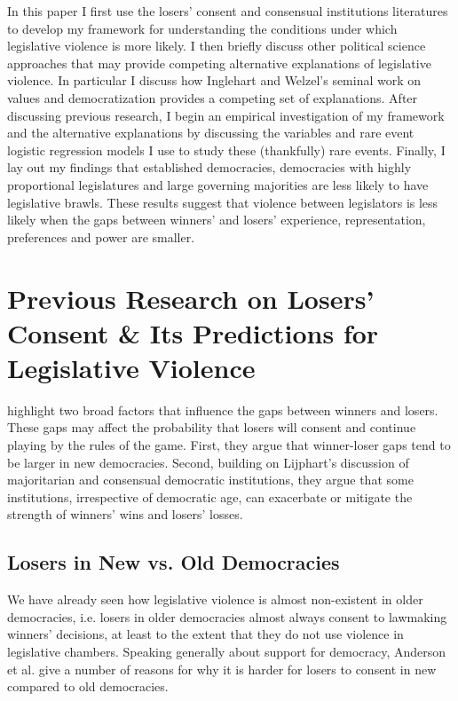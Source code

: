 \documentclass[a4paper]{article}\usepackage{graphicx, color}
\begin{document}
{In this paper I first use the losers' consent and consensual institutions literatures to develop my framework for understanding the conditions under which legislative violence is more likely. I then briefly discuss other political science approaches that may provide competing alternative explanations of legislative violence. In particular I discuss how Inglehart and Welzel's \citep{Inglehart1988, Inglehart2005, Inglehart2010} seminal work on values and democratization provides a competing set of explanations. After discussing previous research, I begin an empirical investigation of my framework and the alternative explanations by discussing the variables and rare event logistic regression models \citep{KingRareEvents2001, KingRareEventsPA2001} I use to study these (thankfully) rare events. Finally, I lay out my findings that established democracies, democracies with highly proportional legislatures and large governing majorities are less likely to have legislative brawls. These results suggest that violence between legislators is less likely when the gaps between winners' and losers' experience, representation, preferences and power are smaller.


\section{Previous Research on Losers' Consent \& Its Predictions for Legislative Violence}

\cite{Anderson2005} highlight two broad factors that influence the gaps between winners and losers. These gaps may affect the probability that losers will consent and continue playing by the rules of the game. First, they argue that winner-loser gaps tend to be larger in new democracies. Second, building on Lijphart's discussion of majoritarian and consensual democratic institutions, they argue that some institutions, irrespective of democratic age, can exacerbate or mitigate the strength of winners' wins and losers' losses.

\subsection{Losers in New vs. Old Democracies}

We have already seen how legislative violence is almost non-existent in older democracies, i.e. losers in older democracies almost always consent to lawmaking winners' decisions, at least to the extent that they do not use violence in legislative chambers. Speaking generally about support for democracy, Anderson et al. \citeyearpar[Chapter 6]{Anderson2005} give a number of reasons for why it is harder for losers to consent in new compared to old democracies. 

}
\end{document}
